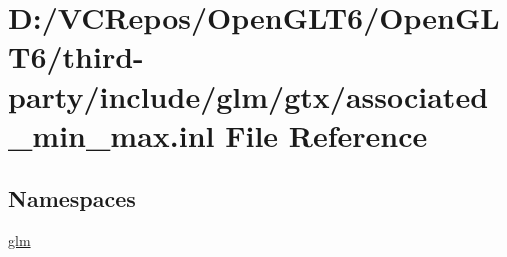 \hypertarget{associated__min__max_8inl}{}\section{D\+:/\+V\+C\+Repos/\+Open\+G\+L\+T6/\+Open\+G\+L\+T6/third-\/party/include/glm/gtx/associated\+\_\+min\+\_\+max.inl File Reference}
\label{associated__min__max_8inl}
\subsection*{Namespaces}
\begin{DoxyCompactItemize}
\item 
 \mbox{\hyperlink{namespaceglm}{glm}}
\end{DoxyCompactItemize}
